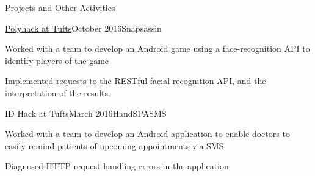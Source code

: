 \documentclass{resume} %
\begin{document}
\begin{rSection}{Projects and Other Activities}

\begin{rSubsection}{\href{http://2016.polyhack.tufts.io/}{Polyhack at Tufts}}{October 2016}{Snapsassin}
\item Worked with a team to develop an Android game using a face-recognition
    API to identify players of the game
\item Implemented requests to the RESTful facial recognition API, and the
    interpretation of the results.
\end{rSubsection}

\begin{rSubsection}{\href{https://idhack16.devpost.com/}{ID Hack at Tufts}}{March 2016}{HandSPASMS}
\item Worked with a team to develop an Android application to enable doctors
    to easily remind patients of upcoming appointments via SMS
\item Diagnosed HTTP request handling errors in the application
\end{rSubsection}


\bigskip
\end{rSection}





\end{document}
